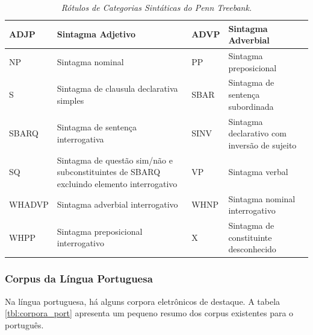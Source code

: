 \begin{table}
   \centering
   \small
   \caption{\it Rótulos de Categorias Sintáticas do Penn Treebank.}

   \begin{tabular}{ | p{2cm} | p{4cm} | p{2cm} | p{4cm} |}

   \hline
		ADJP & Sintagma Adjetivo 	& 	ADVP & Sintagma Adverbial\\
   \hline
		NP & Sintagma nominal 	& 	PP & Sintagma preposicional\\
   \hline
		S & Sintagma de clausula declarativa simples 	& 	SBAR & Sintagma de sentença subordinada\\
   \hline
		SBARQ & Sintagma de sentença interrogativa 	& 	SINV & Sintagma declarativo com inversão de sujeito\\
   \hline
		SQ & Sintagma de questão sim/não e subconstituintes de SBARQ excluindo elemento interrogativo 	& 	 VP & Sintagma verbal\\
   \hline
		WHADVP & Sintagma adverbial interrogativo 	& 	WHNP & Sintagma nominal interrogativo\\
   \hline
		WHPP & Sintagma preposicional interrogativo &    	X & Sintagma de constituinte desconhecido \\
	\hline

   \end{tabular}
   \label{tbl:penn_treebank_cats}
\end{table}

\subsubsection{Corpus da Língua Portuguesa}
\label{sub:corpus_portugues}

Na língua portuguesa, há alguns corpora eletrônicos de destaque. A tabela \ref{tbl:corpora_port} apresenta um pequeno resumo dos corpus existentes para o português.

